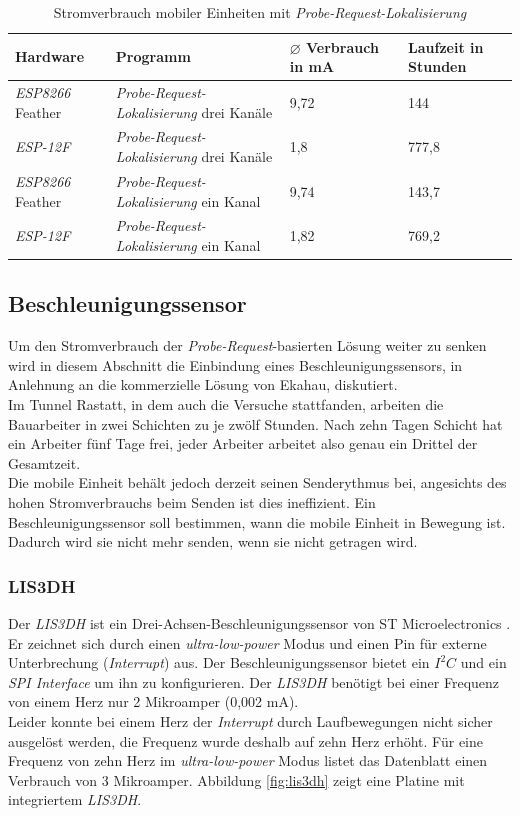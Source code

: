 \begin{table}[h!]
	\centering
	\caption{Stromverbrauch mobiler Einheiten mit \emph{Probe-Request-Lokalisierung}}
	\label{table:probereqina}
	\begin{tabular}{l|p{5.3cm}|p{2.5cm}|p{2.2cm}}
		Hardware & Programm & $\varnothing$ Verbrauch in mA & Laufzeit in Stunden\\
		\hline
		\emph{ESP8266} Feather & \emph{Probe-Request-Lokalisierung} drei Kanäle & 9,72 & 144\\
		\emph{ESP-12F} & \emph{Probe-Request-Lokalisierung} drei Kanäle & 1,8 & 777,8\\
		\emph{ESP8266} Feather & \emph{Probe-Request-Lokalisierung} ein Kanal & 9,74 & 143,7\\
		\emph{ESP-12F} & \emph{Probe-Request-Lokalisierung} ein Kanal & 1,82 & 769,2\\
	\end{tabular}
\end{table}

\subsection{Beschleunigungssensor}
\label{ch:Beschleunigungssensor}
Um den Stromverbrauch der \emph{Probe-Request}-basierten Lösung weiter zu senken wird in diesem Abschnitt die Einbindung eines Beschleunigungssensors, in Anlehnung an die kommerzielle Lösung von Ekahau, diskutiert. \\
Im Tunnel Rastatt, in dem auch die Versuche stattfanden, arbeiten die Bauarbeiter in zwei Schichten zu je zwölf Stunden. 
Nach zehn Tagen Schicht hat ein Arbeiter fünf Tage frei, jeder Arbeiter arbeitet also genau ein Drittel der Gesamtzeit. \\
Die mobile Einheit behält jedoch derzeit seinen Senderythmus bei, angesichts des hohen Stromverbrauchs beim Senden ist dies ineffizient.
Ein Beschleunigungssensor soll bestimmen, wann die mobile Einheit in Bewegung ist. 
Dadurch wird sie nicht mehr senden, wenn sie nicht getragen wird.

\subsubsection{LIS3DH}
Der \emph{LIS3DH} ist ein Drei-Achsen-Beschleunigungssensor von ST Microelectronics \cite{st2015lis}.
Er zeichnet sich durch einen \emph{ultra-low-power} Modus und einen Pin für externe Unterbrechung (\emph{Interrupt}) aus.
Der Beschleunigungssensor bietet ein $I^2C$ und ein \emph{SPI Interface} um ihn zu konfigurieren.
Der \emph{LIS3DH} benötigt bei einer Frequenz von einem Herz nur 2 Mikroamper (0,002 mA).\\
Leider konnte bei einem Herz der \emph{Interrupt} durch Laufbewegungen nicht sicher ausgelöst werden, die Frequenz wurde deshalb auf zehn Herz erhöht.
Für eine Frequenz von zehn Herz im \emph{ultra-low-power} Modus listet das Datenblatt einen Verbrauch von 3 Mikroamper.
Abbildung \ref{fig:lis3dh} zeigt eine Platine mit integriertem \emph{LIS3DH}.

